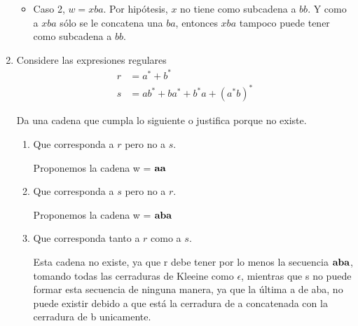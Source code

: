 \documentclass{article}
\begin{document}
\begin{enumerate}
{\begin{enumerate}
{\begin{itemize}
{\begin{itemize}
{                                    $bb$. Y como a $xa$ sólo se le concatena 
                                    una $a$, entonces $xa$ tampoco puede tener
                                    como subcadena a $bb$.
                                }
                                \item {
                                    Caso 2, $w = xba$.
                                    Por hipótesis, $x$ no tiene como subcadena a
                                    $bb$. Y como a $xba$ sólo se le concatena 
                                    una $ba$, entonces $xba$ tampoco puede tener
                                    como subcadena a $bb$.
                                }
                            \end{itemize}
                        }
                    \end{itemize}
                }
            \end{enumerate}
            
        }
        \item {
            Considere las expresiones regulares
            \begin{align*}
                r &= a^* + b^* \\
                s &= ab^* + ba^* + b^*a + (a^*b)^*
            \end{align*}
            
            Da una cadena que cumpla lo siguiente o justifica porque no existe.
            \begin{enumerate}
                \item {
                    Que corresponda a $r$ pero no a $s$.
                    
                    Proponemos la cadena w = $\bf{aa}$\\
                }
                \item {
                    Que corresponda a $s$ pero no a $r$.
                    
                   Proponemos la cadena w = $\bf{aba}$\\
                   
                }
                \item {
                    Que corresponda tanto a $r$ como a $s$.
                    
                    Esta cadena no existe, ya que r debe tener por lo menos la secuencia $\bf{aba}$, tomando todas las cerraduras de Kleeine como $\epsilon$, mientras que s no puede formar esta secuencia de ninguna manera, ya que la última a  de aba, no puede existir debido a que está la cerradura de a concatenada con la cerradura de b unicamente.
                }
            \end{enumerate}
        }
    \end{enumerate}
\end{document}
